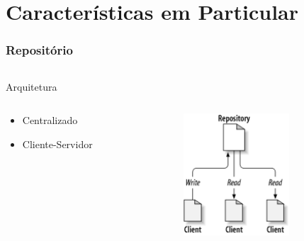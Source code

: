 \documentclass{beamer}
\begin{document}
\section{Caracter\'isticas em Particular}

\begin{frame}
    \frametitle{Reposit\'orio}
    \begin{columns}

        \begin{column}{.555555\textwidth}
            \begin{block}{Arquitetura}
                \begin{columns}
                    \begin{column}{.5\textwidth}
                        \begin{itemize}
                            \item Centralizado
                            \item Cliente-Servidor
                        \end{itemize}
                    \end{column}
                    \begin{column}{.5\textwidth}
                        \begin{figure}
                            \includegraphics[width = 0.7\textwidth]{figures/repositorio}
                        \end{figure}
                    \end{column}
                \end{columns}
            \end{block}
        \end{column}


\end{columns}
\end{frame}
\end{document}

